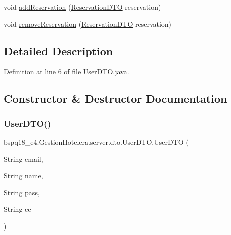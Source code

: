 \begin{DoxyCompactItemize}
\item 
void \mbox{\hyperlink{classbspq18__e4_1_1_gestion_hotelera_1_1server_1_1dto_1_1_user_d_t_o_ad5207354ea308f2b02680220bc7061cf}{add\+Reservation}} (\mbox{\hyperlink{classbspq18__e4_1_1_gestion_hotelera_1_1server_1_1dto_1_1_reservation_d_t_o}{Reservation\+D\+TO}} reservation)
\item 
void \mbox{\hyperlink{classbspq18__e4_1_1_gestion_hotelera_1_1server_1_1dto_1_1_user_d_t_o_a02a18bf530db7ceb072c15e2780e1d5c}{remove\+Reservation}} (\mbox{\hyperlink{classbspq18__e4_1_1_gestion_hotelera_1_1server_1_1dto_1_1_reservation_d_t_o}{Reservation\+D\+TO}} reservation)
\end{DoxyCompactItemize}


\subsection{Detailed Description}


Definition at line 6 of file User\+D\+T\+O.\+java.



\subsection{Constructor \& Destructor Documentation}
\mbox{\label{classbspq18__e4_1_1_gestion_hotelera_1_1server_1_1dto_1_1_user_d_t_o_a07495875c2ac2170892e2e979fbec598}} 
\subsubsection{\texorpdfstring{User\+D\+T\+O()}{UserDTO()}}
{\footnotesize\ttfamily bspq18\+\_\+e4.\+Gestion\+Hotelera.\+server.\+dto.\+User\+D\+T\+O.\+User\+D\+TO (\begin{DoxyParamCaption}\item[{String}]{email,  }\item[{String}]{name,  }\item[{String}]{pass,  }\item[{String}]{cc }\end{DoxyParamCaption})}



